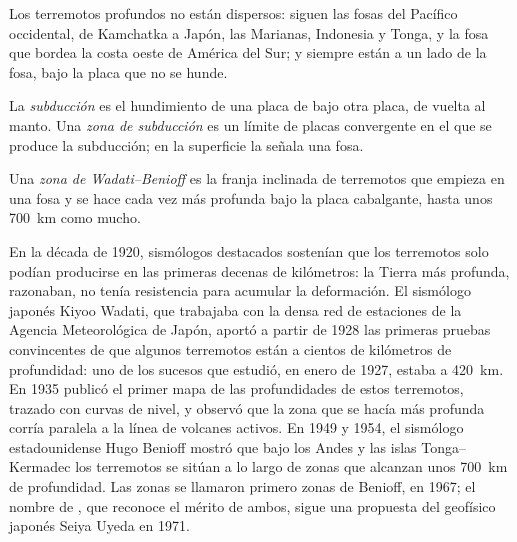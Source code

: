 Los terremotos profundos no están dispersos: siguen las fosas del Pacífico
occidental, de Kamchatka a Japón, las Marianas, Indonesia y Tonga, y la fosa
que bordea la costa oeste de América del Sur; y siempre están a un lado de la
fosa, bajo la placa que no se hunde.

\begin{definition}\label{def:g11:subduction-zones:subduction}
La \emph{subducción} es el hundimiento de una placa de
 bajo otra placa, de vuelta al manto. Una \emph{zona de
subducción} es un límite de placas convergente en el
que se produce la subducción; en la superficie la señala una fosa.
\end{definition}

\begin{definition}\label{def:g11:subduction-zones:benioff}
Una \emph{zona de Wadati--Benioff} es la franja
inclinada de terremotos que empieza en una fosa y se hace cada vez más
profunda bajo la placa cabalgante, hasta unos \qty{700}{km} como mucho.
\end{definition}

\begin{history}
En la década de 1920, sismólogos destacados sostenían que los terremotos solo
podían producirse en las primeras decenas de kilómetros: la Tierra más
profunda, razonaban, no tenía resistencia para acumular la deformación. El sismólogo japonés Kiyoo Wadati, que trabajaba con la
densa red de estaciones de la Agencia Meteorológica de Japón, aportó a partir
de 1928 las primeras pruebas convincentes de que algunos terremotos están a
cientos de kilómetros de profundidad: uno de los sucesos que estudió, en
enero de 1927, estaba a \qty{420}{km}. En 1935 publicó el primer mapa de las
profundidades de estos terremotos, trazado con curvas de nivel, y observó que
la zona que se hacía más profunda corría paralela a la línea de volcanes
activos. En 1949 y 1954, el sismólogo estadounidense Hugo Benioff mostró que
bajo los Andes y las islas Tonga--Kermadec los terremotos se sitúan a lo largo
de zonas que alcanzan unos \qty{700}{km} de profundidad. Las zonas se
llamaron primero zonas de Benioff, en 1967; el nombre de , que reconoce el mérito de ambos, sigue una propuesta del
geofísico japonés Seiya Uyeda en 1971.
\end{history}

